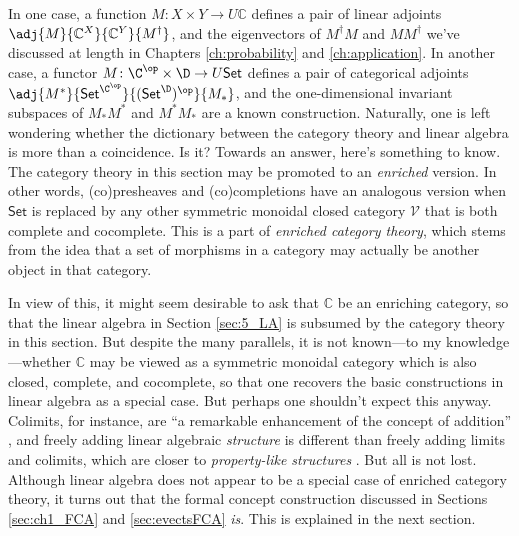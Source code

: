 In one case, a function $M\colon X\times Y\to U\mathbb{C}$ defines a pair of linear adjoints $\adj{M}{\mathbb{C}^X}{\mathbb{C}^Y}{M^\dagger}$, and the eigenvectors of $M^\dagger M$ and $MM^\dagger$ we've discussed at length in Chapters \ref{ch:probability} and \ref{ch:application}. In another case, a functor $M\colon \C^{\op}\times \D\to U\mathsf{Set}$ defines a pair of categorical adjoints $\adj{M^*}{\mathsf{Set}^{\C^{\op}}}{(\mathsf{Set}^\D)^{\op}}{M_*}$, and the one-dimensional invariant subspaces of $M_*M^*$ and $M^*M_*$ are a known construction. Naturally, one is left wondering whether the dictionary between the category theory and linear algebra is more than a coincidence. Is it? Towards an answer, here's something to know. The category theory in this section may be promoted to an \textit{enriched} version. In other words, (co)presheaves and (co)completions have an analogous version when $\mathsf{Set}$ is replaced by any other symmetric monoidal closed category $\mathcal{V}$ that is both complete and cocomplete. This is a part of \emph{enriched category theory}, which stems from the idea that a set of morphisms in a category may actually be another object in that category.

In view of this, it might seem desirable to ask that $\mathbb{C}$ be an enriching category, so that the linear algebra in Section \ref{sec:5_LA} is subsumed by the category theory in this section. But despite the many parallels, it is not known---to my knowledge---whether $\mathbb{C}$ may be viewed as a symmetric monoidal category which is also closed, complete, and cocomplete, so that one recovers the basic constructions in linear algebra as a special case. But perhaps one shouldn't expect this anyway. Colimits, for instance, are ``a remarkable enhancement of the concept of addition'' \cite{baez_2020}, and freely adding linear algebraic \textit{structure} is different than freely adding limits and colimits, which are closer to \textit{property-like structures} \cite[Section 4]{nlab:completion}. But all is not lost. Although linear algebra does not appear to be a special case of enriched category theory, it turns out that the formal concept construction discussed in Sections \ref{sec:ch1_FCA} and \ref{sec:evectsFCA} \textit{is}. This is explained in the next section.

